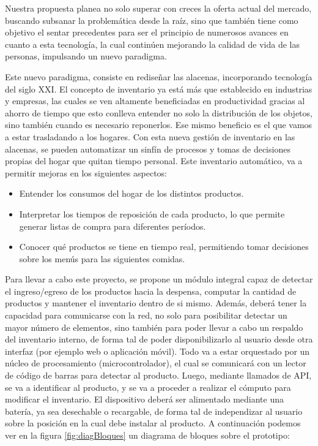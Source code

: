 \documentclass[
11pt, %
codirector, %
]{charter}
\begin{document}
Nuestra propuesta planea no solo superar con creces la oferta actual del mercado, buscando subsanar la problemática desde la raíz, sino que también tiene como objetivo el sentar precedentes para ser el principio de numerosos avances en cuanto a esta tecnología, la cual continúen mejorando la calidad de vida de las personas, impulsando un nuevo paradigma. 

Este nuevo paradigma, consiste en rediseñar las alacenas, incorporando tecnología del siglo XXI. El concepto de inventario ya está más que establecido en  industrias y empresas, las cuales se ven altamente beneficiadas en productividad gracias al ahorro de tiempo que esto conlleva entender no solo la distribución de los objetos, sino también cuando es necesario reponerlos. Ese mismo beneficio es el que vamos a estar trasladando a los hogares. Con esta nueva gestión de inventario en las alacenas, se pueden automatizar un sinfín de procesos y tomas de decisiones propias del hogar que quitan tiempo personal. Este inventario automático, va a permitir mejoras en los siguientes aspectos:

\begin{itemize}
    \item Entender los consumos del hogar de los distintos productos.
    \item Interpretar los tiempos de reposición de cada producto, lo que permite generar listas de compra para diferentes períodos.
    \item Conocer qué productos se tiene en tiempo real, permitiendo tomar decisiones sobre los menús para las siguientes comidas.
\end{itemize}

Para llevar a cabo este proyecto, se propone un módulo integral capaz de detectar el ingreso/egreso de los productos hacia la despensa, computar la cantidad de productos y mantener el inventario dentro de si mismo. Además, deberá tener la capacidad para comunicarse con la red, no solo para posibilitar detectar un mayor número de elementos, sino también para poder llevar a cabo un respaldo del inventario interno, de forma tal de poder disponibilizarlo al usuario desde otra interfaz (por ejemplo web o aplicación móvil). 
Todo va a estar orquestado por un núcleo de procesamiento (microcontrolador), el cual se comunicará con un lector de código de barras para detectar al producto. Luego, mediante llamados de API, se va a identificar al producto, y se va a proceder a realizar el cómputo para modificar el inventario.
El dispositivo deberá ser alimentado mediante una batería, ya sea desechable o recargable, de forma tal de independizar al usuario sobre la posición en la cual debe instalar al producto.
A continuación podemos ver en la figura \ref{fig:diagBloques} un diagrama de bloques sobre el prototipo:
\end{document}
